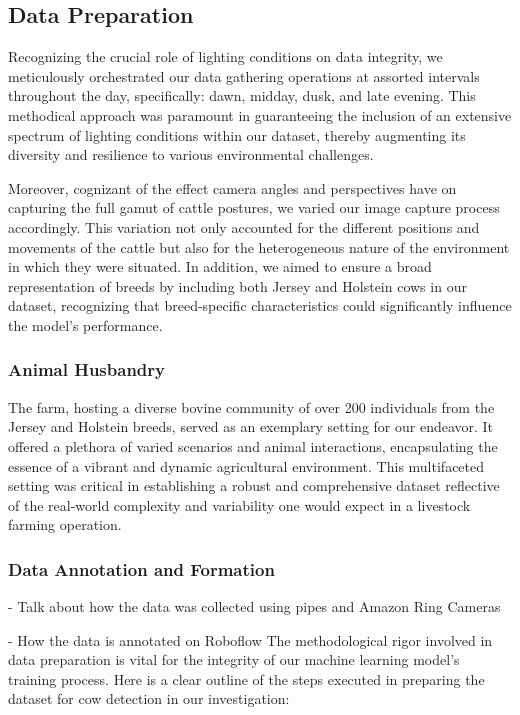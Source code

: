 \subsection*{Data Preparation}


Recognizing the crucial role of lighting conditions on data integrity, we meticulously orchestrated our data gathering operations at assorted intervals throughout the day, specifically: dawn, midday, dusk, and late evening. This methodical approach was paramount in guaranteeing the inclusion of an extensive spectrum of lighting conditions within our dataset, thereby augmenting its diversity and resilience to various environmental challenges.

Moreover, cognizant of the effect camera angles and perspectives have on capturing the full gamut of cattle postures, we varied our image capture process accordingly. This variation not only accounted for the different positions and movements of the cattle but also for the heterogeneous nature of the environment in which they were situated. In addition, we aimed to ensure a broad representation of breeds by including both Jersey and Holstein cows in our dataset, recognizing that breed-specific characteristics could significantly influence the model's performance.

\subsubsection*{Animal Husbandry}


The farm, hosting a diverse bovine community of over 200 individuals from the Jersey and Holstein breeds, served as an exemplary setting for our endeavor. It offered a plethora of varied scenarios and animal interactions, encapsulating the essence of a vibrant and dynamic agricultural environment. This multifaceted setting was critical in establishing a robust and comprehensive dataset reflective of the real-world complexity and variability one would expect in a livestock farming operation.



\subsubsection*{Data Annotation and Formation}

- Talk about how the data was collected using pipes and Amazon Ring Cameras

- How the data is annotated on Roboflow
The methodological rigor involved in data preparation is vital for the integrity of our machine learning model's training process. Here is a clear outline of the steps executed in preparing the dataset for cow detection in our investigation:

